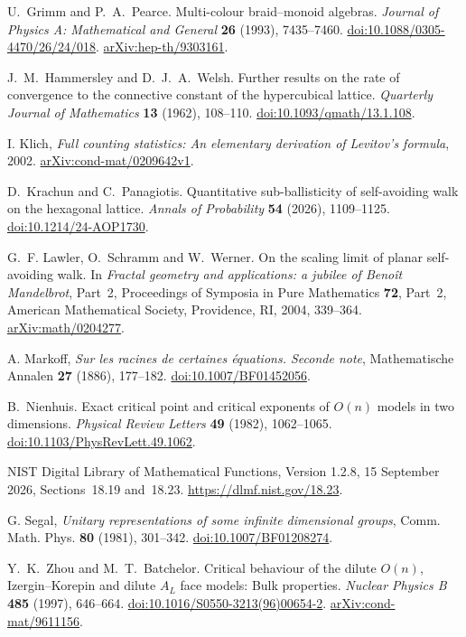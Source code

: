 U.~Grimm and P.~A.~Pearce.
Multi-colour braid--monoid algebras.
\emph{Journal of Physics A: Mathematical and General} \textbf{26} (1993), 7435--7460.
\href{https://doi.org/10.1088/0305-4470/26/24/018}{doi:10.1088/0305-4470/26/24/018}.
\href{https://arxiv.org/abs/hep-th/9303161}{arXiv:hep-th/9303161}.

J.~M.~Hammersley and D.~J.~A.~Welsh.
Further results on the rate of convergence to the connective constant of
the hypercubical lattice.
\emph{Quarterly Journal of Mathematics} \textbf{13} (1962), 108--110.
\href{https://doi.org/10.1093/qmath/13.1.108}{doi:10.1093/qmath/13.1.108}.

I. Klich,
\emph{Full counting statistics: An elementary derivation of Levitov's formula},
2002.
\href{https://arxiv.org/abs/cond-mat/0209642v1}{arXiv:cond-mat/0209642v1}.

D.~Krachun and C.~Panagiotis.
Quantitative sub-ballisticity of self-avoiding walk on the hexagonal lattice.
\emph{Annals of Probability} \textbf{54} (2026), 1109--1125.
\href{https://doi.org/10.1214/24-AOP1730}{doi:10.1214/24-AOP1730}.

G.~F. Lawler, O.~Schramm and W.~Werner.
On the scaling limit of planar self-avoiding walk.
In \emph{Fractal geometry and applications: a jubilee of Beno\^it Mandelbrot},
Part~2, Proceedings of Symposia in Pure Mathematics \textbf{72}, Part~2,
American Mathematical Society, Providence, RI, 2004, 339--364.
\href{https://arxiv.org/abs/math/0204277}{arXiv:math/0204277}.

A. Markoff,
\emph{Sur les racines de certaines \'equations. Seconde note},
Mathematische Annalen \textbf{27} (1886), 177--182.
\href{https://doi.org/10.1007/BF01452056}{doi:10.1007/BF01452056}.

B.~Nienhuis.
Exact critical point and critical exponents of $O(n)$ models in two dimensions.
\emph{Physical Review Letters} \textbf{49} (1982), 1062--1065.
\href{https://doi.org/10.1103/PhysRevLett.49.1062}{doi:10.1103/PhysRevLett.49.1062}.

NIST Digital Library of Mathematical Functions,
Version 1.2.8, 15 September 2026,
Sections~18.19 and~18.23.
\url{https://dlmf.nist.gov/18.23}.

G. Segal,
\emph{Unitary representations of some infinite dimensional groups},
Comm. Math. Phys. \textbf{80} (1981), 301--342.
\href{https://doi.org/10.1007/BF01208274}{doi:10.1007/BF01208274}.

Y.~K.~Zhou and M.~T.~Batchelor.
Critical behaviour of the dilute $O(n)$, Izergin--Korepin and dilute
$A_L$ face models: Bulk properties.
\emph{Nuclear Physics B} \textbf{485} (1997), 646--664.
\href{https://doi.org/10.1016/S0550-3213(96)00654-2}{doi:10.1016/S0550-3213(96)00654-2}.
\href{https://arxiv.org/abs/cond-mat/9611156}{arXiv:cond-mat/9611156}.
